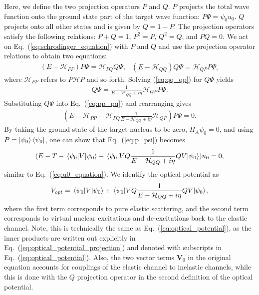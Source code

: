 \documentclass[preprintnumbers,floatfix,aps,prc,preprint,nofootinbib]{revtex4-1}
\begin{document}
Here, we define the two projection operators $P$ and $Q$. $P$ projects the total wave function onto the ground state part of the target wave function: $P \Psi = \psi_0 u_0$. $Q$ projects onto all other states and is given by $Q = 1-P$. The projection operators satisfy the following relations: $P+Q=1$, $P^2 = P$, $Q^2 = Q$, and $P Q = 0$. We act on Eq.~(\ref{eq:schrodinger_equation}) with $P$ and $Q$ and use the projection operator relations to obtain two equations:
%
\begin{subequations}
	\label{eq:intermediate_effective_hamiltonian_equations}
	\begin{eqnarray}
		\label{eq:pp_pq}
		(E - \mathcal{H}_{PP}) P \Psi = \mathcal{H}_{PQ} Q \Psi,
	\end{eqnarray}
	\begin{eqnarray}
		\label{eq:qq_qp}
		(E - \mathcal{H}_{QQ}) Q \Psi = \mathcal{H}_{QP} P \Psi,
	\end{eqnarray}
\end{subequations}
%
where $\mathcal{H}_{PP}$ refers to $P \mathcal{H} P$ and so forth. Solving (\ref{eq:qq_qp}) for $Q \Psi$ yields
%
\begin{eqnarray}
	\label{eq:q_psi}
	Q \Psi = \frac{1}{E - \mathcal{H}_{QQ} + i \eta} \mathcal{H}_{QP} P \Psi.
\end{eqnarray}
%
Substituting $Q \Psi$ into Eq.~(\ref{eq:pp_pq}) and rearranging gives
%
\begin{eqnarray}
	\label{eq:p_psi}
	(E - \mathcal{H}_{PP} - \mathcal{H}_{PQ} \frac{1}{E - \mathcal{H}_{QQ} + i \eta} \mathcal{H}_{QP}) P \Psi = 0.
\end{eqnarray}
%
By taking the ground state of the target nucleus to be zero, $H_A \psi_0 = 0$,  and using $P = \ket{\psi_0} \bra{\psi_0}$, one can show that Eq.~(\ref{eq:p_psi}) becomes
%
\begin{eqnarray}
	\label{eq:p_psi_optical_potential}
	(E - T - \mel{\psi_0}{V}{\psi_0} - \mel{\psi_0}{V Q \frac{1}{E - \mathcal{H}_{QQ} + i \eta} Q V}{\psi_0}) u_0 = 0,
\end{eqnarray}
%
similar to Eq.~(\ref{eq:u0_equation}). We identify the optical potential as
%
\begin{eqnarray}
	\label{eq:optical_potential_projection}
	V_{opt} = \mel{\psi_0}{V}{\psi_0} + \mel{\psi_0}{V Q \frac{1}{E - \mathcal{H}_{QQ} + i \eta} Q V}{\psi_0},
\end{eqnarray}
% 
where the first term corresponds to pure elastic scattering, and the second term corresponds to virtual nuclear excitations and de-excitations back to the elastic channel. Note, this is technically the same as Eq.~(\ref{eq:optical_potential}), as the inner products are written out explicitly in Eq.~(\ref{eq:optical_potential_projection}) and denoted with subscripts in Eq.~(\ref{eq:optical_potential}). Also, the two vector terms $\textbf{V}_0$ in the original equation accounts for couplings of the elastic channel to inelastic channels, while this is done with the $Q$ projection operator in the second definition of the optical potential.
\end{document}
